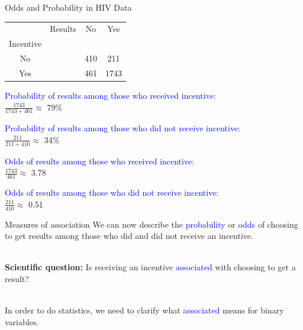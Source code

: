 \documentclass[10pt,t]{beamer}
\begin{document}
\begin{frame}{Odds and Probability in HIV Data}
	\vspace{-5 mm}
	
	\begin{table}
		\centering
	\begin{tabular}{cc|c|c|}
		&Results &No & Yes\\
		Incentive& && \\
		\hline
		No &&410&211\\\hline
		Yes &&461&1743
	\end{tabular}
\end{table}
\smallskip

\textcolor{blue}{Probability of results among those who received incentive:}\\ $\frac{1743}{1743+461}\approx$ 79\%
\bigskip

\textcolor{blue}{Probability of results among those who did not receive incentive:}\\ $\frac{211}{211+410}\approx$ 34\%
\bigskip

\textcolor{blue}{Odds of results among those who received incentive:}\\ $\frac{1743}{461}\approx$ 3.78
\bigskip

\textcolor{blue}{Odds of results among those who did not receive incentive:}\\ $\frac{211}{410}\approx$ 0.51

\end{frame}

\begin{frame}{Measures of association}
	We can now describe the \textcolor{blue}{probability} or \textcolor{blue}{odds} of choosing to get results among those who did and did not receive an incentive. 
	\\ ~\
	
	\textbf{Scientific question:} Is receiving an incentive \textcolor{blue}{associated} with choosing to get a result? 
	\\ ~\
	
	In order to do statistics, we need to clarify what \textcolor{blue}{associated} means for binary variables.
\end{frame}
\end{document}
